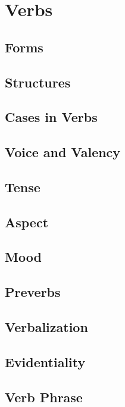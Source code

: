 \chapter{Verbs}
	\section{Forms}
	\section{Structures}
	\section{Cases in Verbs}
	\section{Voice and Valency}
	\section{Tense}
	\section{Aspect}
	\section{Mood}
	\section{Preverbs}
	\section{Verbalization}
	\section{Evidentiality}
	\section{Verb Phrase}
